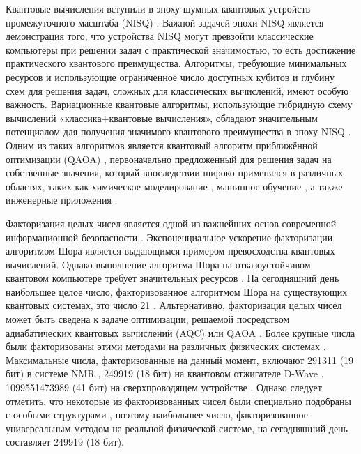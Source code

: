 
Квантовые вычисления вступили в эпоху шумных квантовых устройств промежуточного
масштаба (NISQ) \cite{cite_1, cite_2}. Важной задачей эпохи NISQ является
демонстрация того, что устройства NISQ могут превзойти классические компьютеры
при решении задач с практической значимостью, то есть достижение практического
квантового преимущества. Алгоритмы, требующие минимальных ресурсов и
использующие ограниченное число доступных кубитов и глубину схем для решения
задач, сложных для классических вычислений, имеют особую важность. Вариационные
квантовые алгоритмы, использующие гибридную схему вычислений
«классика+квантовые вычисления», обладают значительным потенциалом для
получения значимого квантового преимущества в эпоху NISQ \cite{cite_3, cite_4,
cite_2, cite_5, cite_6}. Одним из таких алгоритмов является квантовый алгоритм
приближённой оптимизации (QAOA) \cite{cite_5}, первоначально предложенный для
решения задач на собственные значения, который впоследствии широко применялся в
различных областях, таких как химическое моделирование \cite{cite_7, cite_8},
машинное обучение \cite{cite_9}, а также инженерные приложения \cite{cite_10,
cite_11}.

Факторизация целых чисел является одной из важнейших основ современной
информационной безопасности \cite{cite_12}. Экспоненциальное ускорение
факторизации алгоритмом Шора \cite{cite_13} является выдающимся примером
превосходства квантовых вычислений. Однако выполнение алгоритма Шора на
отказоустойчивом квантовом компьютере требует значительных ресурсов
\cite{cite_14, cite_15}. На сегодняшний день наибольшее целое число,
факторизованное алгоритмом Шора на существующих квантовых системах, это число
21 \cite{cite_16, cite_17, cite_18}. Альтернативно, факторизация целых чисел
может быть сведена к задаче оптимизации, решаемой посредством адиабатических
квантовых вычислений (AQC) \cite{cite_19, cite_20, cite_21, cite_22} или QAOA
\cite{cite_23}. Более крупные числа были факторизованы этими методами на
различных физических системах \cite{cite_24, cite_25, cite_26, cite_27}.
Максимальные числа, факторизованные на данный момент, включают 291311 (19 бит)
в системе NMR \cite{cite_26}, 249919 (18 бит) на квантовом отжигателе D-Wave
\cite{cite_25}, 1099551473989 (41 бит) на сверхпроводящем устройстве
\cite{cite_27}. Однако следует отметить, что некоторые из факторизованных чисел
были специально подобраны с особыми структурами \cite{cite_28}, поэтому
наибольшее число, факторизованное универсальным методом на реальной физической
системе, на сегодняшний день составляет 249919 (18 бит).

